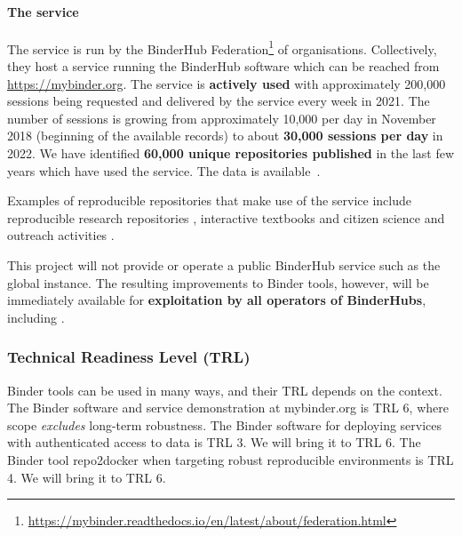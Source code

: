\paragraph{The \mybinder{} service}\label{sec:mybinder}

The \mybinder{} service is run by the BinderHub
Federation\footnote{\url{https://mybinder.readthedocs.io/en/latest/about/federation.html}}
of organisations. Collectively, they host a service running the BinderHub software
which can be reached from \url{https://mybinder.org}.
The service is \textbf{actively used} with approximately 200,000 sessions being
requested and delivered by the \mybinder{} service every week in 2021. The number
of sessions is growing from approximately 10,000 per day in November 2018
(beginning of the available records) to about \textbf{30,000 sessions per day} in 2022. We have
identified \textbf{60,000 unique repositories published} in the last few years which have
used the \mybinder{} service. The data is available~\cite{mybinder-archive}.

Examples of reproducible repositories that make use of the \mybinder{} service
include reproducible research repositories
\cite{GitHubRepoExampleAlbert2016,Beg2021}, interactive textbooks
\cite{Fangohr2022,Zeller2022} and citizen science and outreach activities
\cite{ligo-open-science,OSCOVIDA2022}.

This \TheProject{} project will not provide or operate a public BinderHub service such as the global
\mybinder{} instance. The resulting improvements to Binder tools, however, will be
immediately available for \textbf{exploitation by all operators of BinderHubs}, including \mybinder{}.


\subsubsection{Technical Readiness Level (TRL)}

Binder tools can be used in many ways, and their TRL depends on the context. 
The Binder software and service demonstration at mybinder.org is TRL 6,
where scope \emph{excludes} long-term robustness.
The Binder software for deploying services with authenticated access to data is TRL 3.
We will bring it to TRL 6.
The Binder tool repo2docker when targeting robust reproducible environments is TRL 4.
We will bring it to TRL 6.


